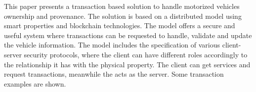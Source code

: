 This paper presents a transaction based solution to handle motorized vehicles ownership and provenance.
The solution is based on a distributed model using smart properties and blockchain technologies. 
The model offers a secure and useful system 
where transactions can be requested to handle, validate and update the vehicle information. 
The model includes the specification of various client-server security protocols,  
where the client can have different roles accordingly to the relationship it has with the physical property. 
The client can get services and request transactions,
meanwhile the \blockchaincarnetwork  acts as the server. 
Some transaction examples are shown. 

